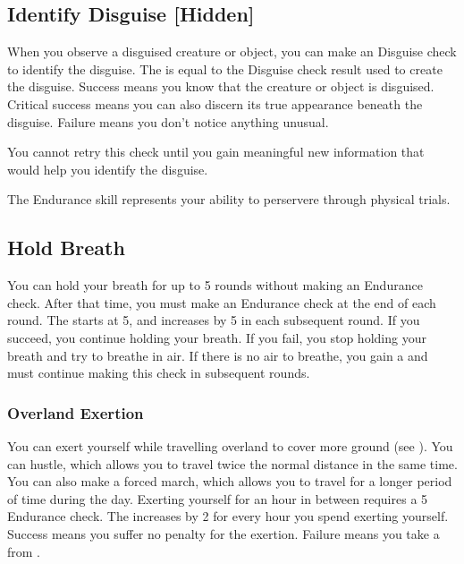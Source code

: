     \subsection{Identify Disguise [Hidden]}
        When you observe a disguised creature or object, you can make an Disguise check to identify the disguise.
        The  is equal to the Disguise check result used to create the disguise.
        Success means you know that the creature or object is disguised.
        Critical success means you can also discern its true appearance beneath the disguise.
        Failure means you don't notice anything unusual.

        You cannot retry this check until you gain meaningful new information that would help you identify the disguise.

\newpage
{}
    The Endurance skill represents your ability to perservere through physical trials.

    \subsection{Hold Breath}\label{Hold Breath}
        You can hold your breath for up to 5 rounds without making an Endurance check.
        After that time, you must make an Endurance check at the end of each round.
        The  starts at 5, and increases by 5 in each subsequent round.
        If you succeed, you continue holding your breath.
        If you fail, you stop holding your breath and try to breathe in air.
        If there is no air to breathe, you gain a  and must continue making this check in subsequent rounds.

    \subsubsection{Overland Exertion}\label{Overland Exertion}
        You can exert yourself while travelling overland to cover more ground (see ).
        You can hustle, which allows you to travel twice the normal distance in the same time.
        You can also make a forced march, which allows you to travel for a longer period of time during the day.
        Exerting yourself for an hour in between  requires a  5 Endurance check.
        The  increases by 2 for every hour you spend exerting yourself.
        Success means you suffer no penalty for the exertion.
        Failure means you take a  from .

